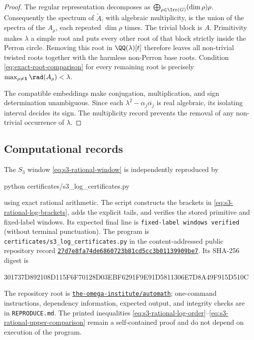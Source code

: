 \begin{proof}
The regular representation decomposes as
\(\bigoplus_{\rho\in\Irr(G)}(\dim\rho)\rho\).  Consequently the spectrum of
\(\widetilde A\), with algebraic multiplicity, is the union of the spectra of
the \(A_\rho\), each repeated \(\dim\rho\) times.  The trivial block is \(A\).
Primitivity makes \(\lambda\) a simple root and puts every other root of that
block strictly inside the Perron circle.  Removing this root in
\(\QQ(\lambda)[t]\) therefore leaves all non-trivial twisted roots together
with the harmless non-Perron base roots.  Condition
\eqref{eq:exact-root-comparison} for every remaining root is precisely
\(\max_{\rho\neq\mathbf1}\rad(A_\rho)<\lambda\).

The compatible embeddings make conjugation, multiplication, and sign
determination unambiguous.  Since each
\(\lambda^2-\alpha_j\overline{\alpha_j}\) is real algebraic, its isolating
interval decides its sign.  The multiplicity record prevents the removal of
any non-trivial occurrence of \(\lambda\).
\end{proof}

\subsection{Computational records}

The \(S_3\) window \eqref{eq:s3-rational-window} is independently reproduced
by
\begin{center}
\ttfamily
python certificates/s3\_log\_certificates.py
\end{center}
using exact rational arithmetic.  The script constructs the brackets in
\eqref{eq:s3-rational-log-brackets}, adds the explicit tails, and verifies the
stored primitive and fixed-label windows.  Its expected final line is
\texttt{fixed-label windows verified} (without terminal punctuation).  The program is
\texttt{certificates/s3\_log\_certificates.py} in the content-addressed public
repository record
\href{https://github.com/the-omega-institute/automath/tree/27d7e8fa74de6860723b81cd5cc3b01139909be7}{\texttt{27d7e8fa74de6860723b81cd5cc3b01139909be7}}.
Its SHA-256 digest is
\begin{center}
 \footnotesize\ttfamily
 301737D892108D115F6F70128D03EBF6291F9E91D5811306E7D8A49F915D510C
\end{center}
The repository root is
\href{https://github.com/the-omega-institute/automath}{\texttt{the-omega-institute/automath}};
one-command
instructions, dependency information, expected output, and integrity checks
are in \texttt{REPRODUCE.md}.  The printed inequalities
\eqref{eq:s3-rational-log-order}--\eqref{eq:s3-rational-upper-comparison}
remain a self-contained proof and do not depend on execution of the program.

